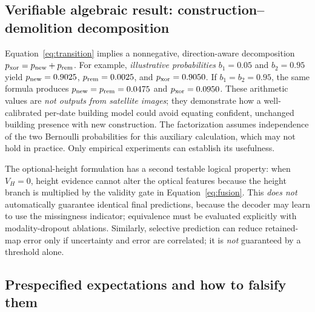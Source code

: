 \documentclass[11pt,a4paper]{article}
\begin{document}
\subsection{Verifiable algebraic result: construction--demolition decomposition}

Equation~\eqref{eq:transition} implies a nonnegative, direction-aware decomposition $p_{\rm xor}=p_{\rm new}+p_{\rm rem}$. For example, \emph{illustrative probabilities} $b_1=0.05$ and $b_2=0.95$ yield $p_{\rm new}=0.9025$, $p_{\rm rem}=0.0025$, and $p_{\rm xor}=0.9050$. If $b_1=b_2=0.95$, the same formula produces $p_{\rm new}=p_{\rm rem}=0.0475$ and $p_{\rm xor}=0.0950$. These arithmetic values are \emph{not outputs from satellite images}; they demonstrate how a well-calibrated per-date building model could avoid equating confident, unchanged building presence with new construction. The factorization assumes independence of the two Bernoulli probabilities for this auxiliary calculation, which may not hold in practice. Only empirical experiments can establish its usefulness.

The optional-height formulation has a second testable logical property: when $V_H=0$, height evidence cannot alter the optical features because the height branch is multiplied by the validity gate in Equation~\eqref{eq:fusion}. This \emph{does not} automatically guarantee identical final predictions, because the decoder may learn to use the missingness indicator; equivalence must be evaluated explicitly with modality-dropout ablations. Similarly, selective prediction can reduce retained-map error only if uncertainty and error are correlated; it is \emph{not} guaranteed by a threshold alone.

\subsection{Prespecified expectations and how to falsify them}
\end{document}
